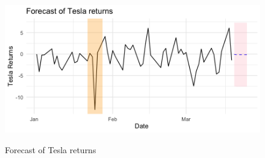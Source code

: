 \documentclass[a4paper,12pt]{article}
\begin{document}
\begin{figure}[!h]
\caption{Forecast of Tesla returns}
\begin{center}
\includegraphics[width=0.7\columnwidth]{tsla_frcst.png}
\label{temps}
\end{center}
\end{figure}

\bigskip

\newpage

\newpage

\clearpage


\printbibliography
\end{document}
